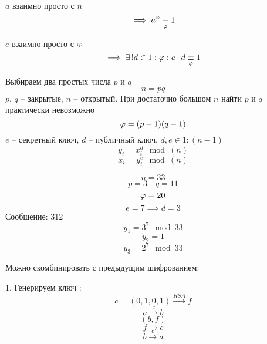 \begin{lemma}
	$a$ взаимно просто с $n$
    $$ \implies a^{\varphi} \underset{\varphi}{\equiv} 1 $$
\end{lemma}

\begin{lemma}
	$e$ взаимно просто с $\varphi$
    $$ \implies \exists\, ! d \in 1:\varphi : e \cdot d \underset{\varphi}{\equiv} 1 $$
\end{lemma}



\begin{algorithm}
	Выбираем два простых числа $p$ и $q$ \\
    $$ n = pq$$
    $p$, $q$ -- закрытые, $n$ -- открытый. При достаточно большом $n$ найти $p$ и $q$ практически невозможно
    $$ \varphi = (p-1)(q-1) $$
    $e$ -- секретный ключ, $d$ -- публичный ключ, $d, e \in 1:(n-1)$
    $$ y_i = x_i^d \mod (n) $$
    $$ x_i = y_i^e \mod (n) $$
\end{algorithm}

\begin{eg}
	$$ n = 33 $$
    $$ p = 3 \quad q = 11 $$
    $$ \varphi = 20 $$
    $$ e = 7 \implies d = 3 $$
    Сообщение: 312
    $$ y_1 = 3^7 \mod 33 $$
    $$ y_2 = 1 $$
    $$ y_3 = 2^7 \mod 33 $$
\end{eg}

Можно скомбинировать с предыдущим шифрованием:
\begin{algorithm}
    1. Генерируем ключ :
    $$ c = (0,1,0,1) \xrightarrow{RSA} f $$
    $$ a \xrightarrow{c} b $$
    $$ (b,f) $$
    $$ f \to c $$
    $$ b \xrightarrow{c} a $$
\end{algorithm}

